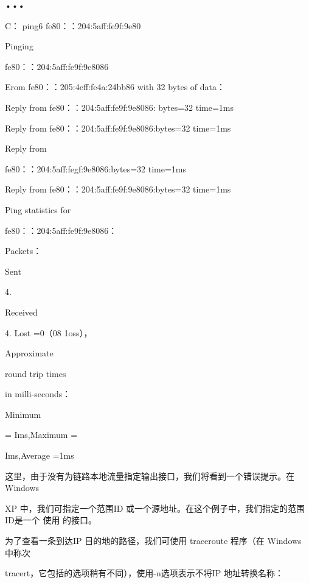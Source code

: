 •••

C：\> ping6 fe80：：204:5aff:fe9f:9e80%

Pinging

fe80：：204:5aff:fe9f:9e8086

Erom fe80：：205:4eff:fe4a:24bb86 with 32 bytes of data：

Reply from fe80：：204:5aff:fe9f:9e8086: bytes=32 time=1ms

Reply from fe80：：204:5aff:fe9f:9e8086:bytes=32 time=1ms

Reply from

fe80：：204:5aff:fegf:9e8086:bytes=32 time=1ms

Reply from fe80：：204:5aff:fe9f:9e8086:bytes=32 time=1ms

Ping statistics for

fe80：：204:5aff:fe9f:9e8086：

Packets：

Sent

4.

Received

4. Lost =0（08 1oss），

Approximate

round trip times

in milli-seconds：

Minimum

= Ims,Maximum =

Ims,Average =1ms

这里，由于没有为链路本地流量指定输出接口，我们将看到一个错误提示。在 Windows

XP 中，我们可指定一个范围ID 或一个源地址。在这个例子中，我们指定的范围ID是一个
使用%
的接口。

为了查看一条到达IP 目的地的路径，我们可使用 traceroute 程序（在 Windows 中称次

tracert，它包括的选项稍有不同），使用-n选项表示不将IP 地址转换名称：

